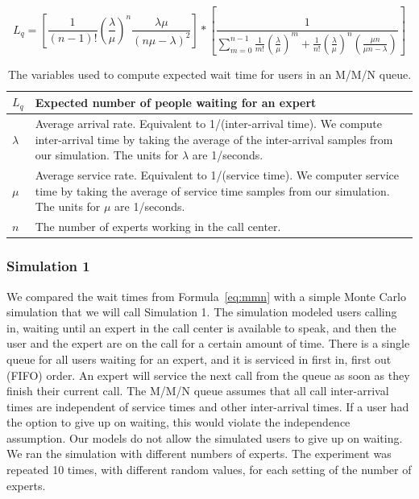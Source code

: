 \begin{equation}
  L_q = \left[ \frac{1}{(n - 1)!} \left( \frac{\lambda}{\mu} \right)^n
    \frac{\lambda \mu}{(n \mu - \lambda)^2} \right] *
  \left[ \frac{1}{\sum_{m=0}^{n-1} \frac{1}{m!} \left( \frac{\lambda}{\mu}
      \right)^m + \frac{1}{n!} \left( \frac{\lambda}{\mu} \right)^n
    \left( \frac{\mu n}{\mu n - \lambda} \right) } \right]
  \label{eq:num_waiting}
\end{equation}

\begin{table}
  \begin{tabular}{|l|p{5.8in}|}
    \hline
    $L_q$ & Expected number of people waiting for an expert\\
    \hline
    $\lambda$ & Average arrival rate. Equivalent to 1/(inter-arrival time).
                We compute inter-arrival time by taking the average of the
                inter-arrival samples from our simulation.
                The units for $\lambda$ are 1/seconds.\\
    \hline
    $\mu$ & Average service rate. Equivalent to 1/(service time).
            We computer service time by taking the average of service time
            samples from our simulation.
            The units for $\mu$ are 1/seconds.\\
    \hline
    $n$ & The number of experts working in the call center.\\
    \hline
  \end{tabular}
  \caption{The variables used to compute expected wait time for users in an
  M/M/N queue.}\label{tab:vars}
\end{table}

\subsubsection{Simulation 1}

We compared the wait times from Formula~\ref{eq:mmn} with a simple Monte Carlo
simulation that we will call Simulation 1.
The simulation modeled users calling in, waiting until an expert in the
call center is available to speak, and then the user and the expert are on the
call for a certain amount of time.
There is a single queue for all users waiting for an expert, and it is serviced
in first in, first out (FIFO) order.
An expert will service the next call from the queue as soon as they finish their
current call.
The M/M/N queue assumes that all call inter-arrival times are independent of
service times and other inter-arrival times.
If a user had the option to give up on waiting, this would violate the
independence assumption.
Our models do not allow the simulated users to give up on waiting.
We ran the simulation with different numbers of experts.
The experiment was repeated 10 times, with different random values, for each
setting of the number of experts.

